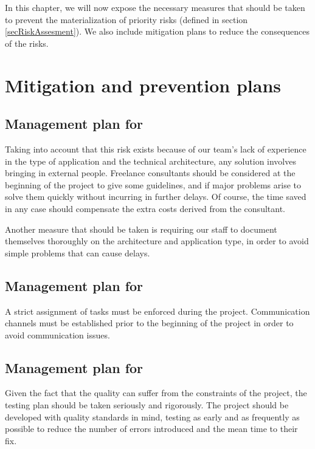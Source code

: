 
In this chapter, we will now expose the necessary measures that should be taken to prevent the materialization of priority risks (defined in section \ref{secRiskAssesment}). We also include mitigation plans to reduce the consequences of the risks.

\section{Mitigation and prevention plans}
\label{secMitigation}

\subsection{Management plan for }

Taking into account that this risk exists because of our team's lack of experience in the type of application and the technical architecture, any solution involves bringing in external people. Freelance consultants should be considered at the beginning of the project to give some guidelines, and if major problems arise to solve them quickly without incurring in further delays. Of course, the time saved in any case should compensate the extra costs derived from the consultant.

Another measure that should be taken is requiring our staff to document themselves thoroughly on the architecture and application type, in order to avoid simple problems that can cause delays.

\subsection{Management plan for }

A strict assignment of tasks must be enforced during the project. Communication channels must be established prior to the beginning of the project in order to avoid communication issues.

\subsection{Management plan for }

Given the fact that the quality can suffer from the constraints of the project, the testing plan should be taken seriously and rigorously. The project should be developed with quality standards in mind, testing as early and as frequently as possible to reduce the number of errors introduced and the mean time to their fix.

